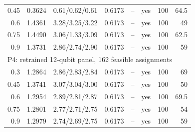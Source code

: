 \begin{longtable}{rrrrlrrr}
0.45 & 0.3624 & 0.61/0.62/0.61 & 0.6173 & -- & yes & 100 & 64.5 \\
0.6 & 1.4361 & 3.28/3.25/3.22 & 0.6173 & -- & yes & 100 & 49 \\
0.75 & 1.4490 & 3.06/1.33/3.09 & 0.6173 & -- & yes & 100 & 62.5 \\
0.9 & 1.3731 & 2.86/2.74/2.90 & 0.6173 & -- & yes & 100 & 59 \\
\multicolumn{8}{l}{P4: retrained 12-qubit panel, 162 feasible assignments} \\
0.3 & 1.2864 & 2.86/2.83/2.84 & 0.6173 & -- & yes & 100 & 69 \\
0.45 & 1.3741 & 3.07/3.04/3.00 & 0.6173 & -- & yes & 100 & 50 \\
0.6 & 1.2954 & 2.89/2.81/2.87 & 0.6173 & -- & yes & 100 & 69.5 \\
0.75 & 1.2801 & 2.77/2.71/2.75 & 0.6173 & -- & yes & 100 & 54 \\
0.9 & 1.2979 & 2.74/2.69/2.75 & 0.6173 & -- & yes & 100 & 59 \\
\bottomrule
\end{longtable}
\endgroup


